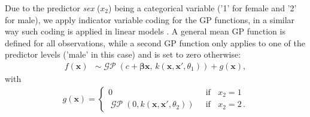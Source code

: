\documentclass[onecolumn,a4paper,11pt]{article}
\DeclareMathOperator{\GP}{\mathcal{GP}}
\begin{document}
Due to the predictor \textit{sex} ($x_2$) being a categorical variable ('1' for female and '2' for male), we apply indicator variable coding for the GP functions, in a similar way such coding is applied in linear models \citep{Gelman+Hill+Vehtari:2020:ROS}. A general mean GP function is defined for all observations, while a second GP function only applies to one of the predictor levels ('male' in this case) and is set to zero otherwise:
%
\begin{align} 
f(\bm{x}) &\sim \GP\left(c + \bm{\beta}\bm{x},\, k(\bm{x},\bm{x}', \theta_1)\right) + g(\bm{x}), \label{ch5_eq_gpml1}
\end{align}
with
%
\begin{align} \label{ch5_eq_gpml2}
g(\bm{x}) =
\left\{
	\begin{array}{ll}
		0 & \;\; \mbox{if } \;\; x_2=1  \\
		\GP\left(0, k(\bm{x},\bm{x}', \theta_2)\right)  & \;\; \mbox{if } \;\; x_2=2 \,.
	\end{array}
\right. 
\end{align}

\end{document}
